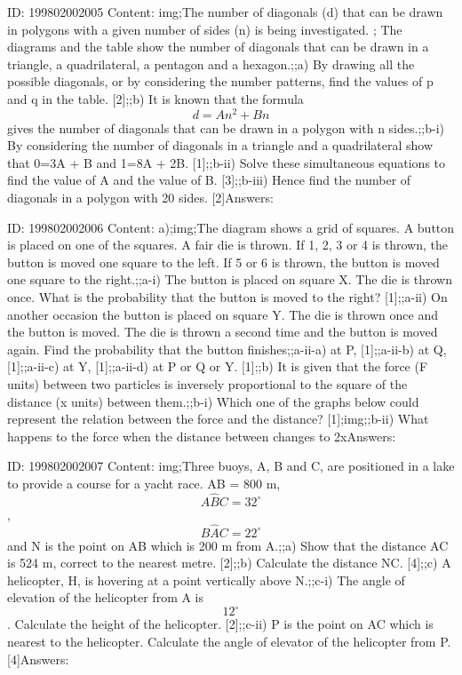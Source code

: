 \documentclass{article}
\begin{document}
ID: 199802002005
Content:
img;The number of diagonals (d) that can be drawn in polygons with a given number of sides (n) is being investigated. ; The diagrams and the table show the number of diagonals that can be drawn in a triangle, a quadrilateral, a pentagon and a hexagon.;;a) By drawing all the possible diagonals, or by considering the number patterns, find the values of p and q in the table. [2];;b) It is known that the formula $$d=An^{2} +Bn$$ gives the number of diagonals that can be drawn in a polygon with n sides.;;b-i) By considering the number of diagonals in a triangle and a quadrilateral show that 0=3A + B and 1=8A + 2B. [1];;b-ii) Solve these simultaneous equations to find the value of A and the value of B. [3];;b-iii) Hence find the number of diagonals in a polygon with 20 sides. [2]Answers:

ID: 199802002006
Content:
a);img;The diagram shows a grid of squares. A button is placed on one of the squares. A fair die is thrown. If 1, 2, 3 or 4 is thrown, the button is moved one square to the left. If 5 or 6 is thrown, the button is moved one square to the right.;;a-i) The button is placed on square X. The die is thrown once. What is the probability that the button is moved to the right? [1];;a-ii) On another occasion the button is placed on square Y. The die is thrown once and the button is moved. The die is thrown a second time and the button is moved again. Find the probability that the button finishes;;a-ii-a) at P, [1];;a-ii-b) at Q, [1];;a-ii-c) at Y, [1];;a-ii-d) at P or Q or Y. [1];;b) It is given that the force (F units) between two particles is inversely proportional to the square of the distance (x units) between them.;;b-i) Which one of the graphs below could represent the relation between the force and the distance? [1];img;;b-ii) What happens to the force when the distance between changes to 2xAnswers:

ID: 199802002007
Content:
img;Three buoys, A, B and C, are positioned in a lake to provide a course for a yacht race. AB = 800 m, $$A \hat BC=32^{\circ}$$, $$B \hat AC=22^{\circ}$$ and N is the point on AB which is 200 m from A.;;a) Show that the distance AC is 524 m, correct to the nearest metre. [2];;b) Calculate the distance NC. [4];;c) A helicopter, H, is hovering at a point vertically above N.;;c-i) The angle of elevation of the helicopter from A is $$12^{\circ}$$. Calculate the height of the helicopter. [2];;c-ii) P is the point on AC which is nearest to the helicopter. Calculate the angle of elevator of the helicopter from P. [4]Answers:
\end{document}
